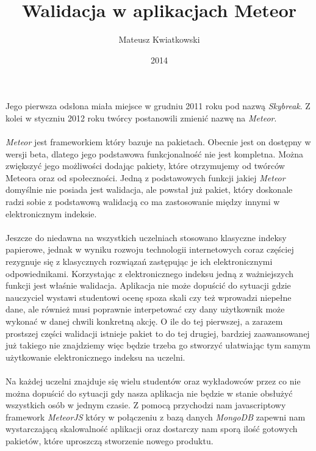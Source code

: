 \documentclass[brudnopis]{xmgr}
\author   {Mateusz Kwiatkowski}
\title    {Walidacja w aplikacjach Meteor}
\date     {2014}
\begin{document}
\begin{abstract}
\end{abstract}

\maketitle
%
\introduction

 Jego pierwsza odsłona miała miejsce w grudniu 2011 roku pod nazwą \textit{Skybreak}.
Z kolei w styczniu 2012 roku twórcy postanowili zmienić nazwę na \textit{Meteor}.
\\
\\
\textit{Meteor} jest frameworkiem który bazuje na pakietach. Obecnie jest on dostępny w wersji beta, dlatego jego
podstawowa funkcjonalność nie jest kompletna. Można zwiększyć jego możliwości dodając pakiety, które otrzymujemy
od twórców Meteora oraz od społeczności.
Jedną z podstawowych funkcji jakiej \textit{Meteor} domyślnie nie posiada jest walidacja, ale powstał już pakiet, który doskonale radzi
sobie z podstawową walidacją co ma zastosowanie między innymi w elektronicznym indeksie.
\\
\\
Jeszcze do niedawna na wszystkich uczelniach stosowano klasyczne indeksy
papierowe, jednak w wyniku rozwoju technologii internetowych coraz częściej
rezygnuje się z klasycznych rozwiązań zastępując je ich elektronicznymi odpowiednikami.
Korzystając z elektronicznego indeksu jedną z ważniejszych funkcji jest właśnie walidacja. Aplikacja nie może dopuścić do
sytuacji gdzie nauczyciel wystawi studentowi ocenę spoza skali czy też wprowadzi niepełne dane, ale również musi
poprawnie interpetować czy dany użytkownik może wykonać w danej chwili konkretną akcję. O ile do tej pierwszej, a zarazem prostszej części
walidacji istnieje pakiet to do tej drugiej, bardziej zaawansowanej już takiego nie znajdziemy więc będzie trzeba go stworzyć ułatwiając tym samym
użytkowanie elektronicznego indeksu na uczelni.
\\
\\
Na każdej uczelni znajduje się wielu studentów oraz wykładowców przez co nie można dopuścić do sytuacji gdy nasza
aplikacja nie będzie w stanie obsłużyć wszystkich osób w jednym czasie. Z pomocą przychodzi nam javascriptowy
framework \textit{MeteorJS} który w połączeniu z bazą danych \textit{MongoDB} zapewni nam wystarczającą skalowalność
aplikacji oraz dostarczy nam sporą ilość gotowych pakietów, które uproszczą stworzenie nowego produktu.
\end{document}
